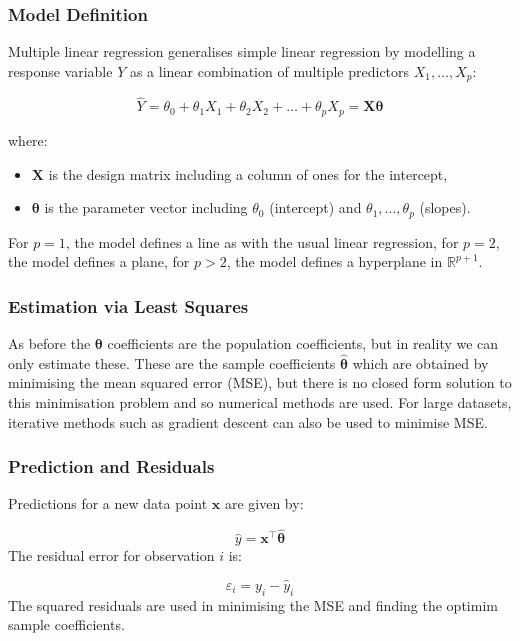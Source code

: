 \documentclass[9pt]{extarticle}
\begin{document}
\subsubsection*{Model Definition}

Multiple linear regression generalises simple linear regression by modelling a response variable $Y$ as a linear combination of multiple predictors $X_1, \dots, X_p$:

\[
\hat{Y} = \theta_0 + \theta_1 X_1 + \theta_2 X_2 + \dots + \theta_p X_p = \mathbf{X}\boldsymbol{\theta}
\]

where:
\begin{itemize}
    \item $\mathbf{X}$ is the design matrix including a column of ones for the intercept,
    \item $\boldsymbol{\theta}$ is the parameter vector including $\theta_0$ (intercept) and $\theta_1, \dots, \theta_p$ (slopes).
\end{itemize}
For $p = 1$, the model defines a line as with the usual linear regression, 
for $p = 2$, the model defines a plane, 
for $p > 2$, the model defines a hyperplane in $\mathbb{R}^{p+1}$.

\subsubsection*{Estimation via Least Squares}

As before the $\boldsymbol{\theta}$ coefficients are the population 
coefficients, but in reality we can only estimate these. 
These are the sample coefficients $\boldsymbol{\hat{\theta}}$ which are obtained by minimising the 
mean squared error (MSE), but there is no closed form solution 
to this minimisation problem and so numerical methods are used.
For large datasets, 
iterative methods such as gradient descent can also be used to minimise MSE.

\subsubsection*{Prediction and Residuals}

Predictions for a new data point $\mathbf{x}$ are given by:

\[
\hat{y} = \mathbf{x}^\top \boldsymbol{\hat{\theta}}
\]
The residual error for observation $i$ is:

\[
\varepsilon_i = y_i - \hat{y}_i
\]
The squared residuals are used in minimising the MSE and finding the 
optimim sample coefficients.
\end{document}
